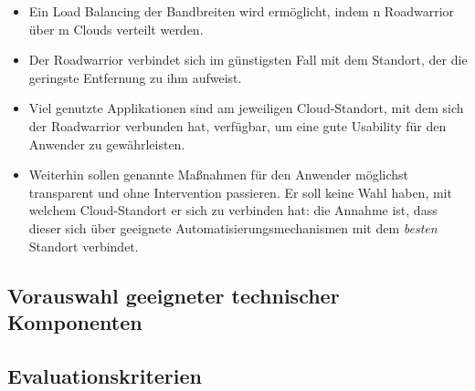 \begin{itemize}
\item Ein Load Balancing der Bandbreiten wird ermöglicht, indem n Roadwarrior über m Clouds verteilt werden.
\item Der Roadwarrior verbindet sich im günstigsten Fall mit dem Standort, der die geringste Entfernung zu ihm aufweist.
\item Viel genutzte Applikationen sind am jeweiligen Cloud-Standort, mit dem sich der Roadwarrior verbunden hat, verfügbar, um eine gute Usability für den Anwender zu gewährleisten.
\item Weiterhin sollen genannte Maßnahmen für den Anwender möglichst transparent und ohne Intervention passieren. Er soll keine Wahl haben, mit welchem Cloud-Standort er sich zu verbinden hat: die Annahme ist, dass dieser sich über geeignete Automatisierungsmechanismen mit dem \textit{besten} Standort verbindet.
\end{itemize}


\subsection{Vorauswahl geeigneter technischer Komponenten}
\subsection{Evaluationskriterien}